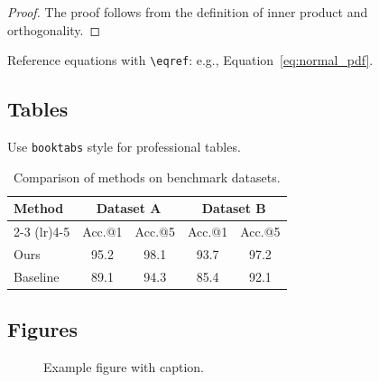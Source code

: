 \documentclass[]{fairmeta} %
\theoremstyle{plain}
\theoremstyle{definition}
\theoremstyle{remark}
\begin{document}
\begin{proof}
The proof follows from the definition of inner product and orthogonality.
\end{proof}

Reference equations with \verb|\eqref|: e.g., Equation~\eqref{eq:normal_pdf}.


\subsection{Tables}
\label{sec:tables}

Use \texttt{booktabs} style for professional tables.

\begin{table}[htbp]
  \centering
  \caption{Comparison of methods on benchmark datasets.}
  \begin{tabular}{lcccc}
    \toprule
    \multirow{2}{*}{Method} & \multicolumn{2}{c}{Dataset A} & \multicolumn{2}{c}{Dataset B} \\
    \cmidrule(lr){2-3} \cmidrule(lr){4-5}
           & Acc.@1 & Acc.@5 & Acc.@1 & Acc.@5 \\
    \midrule
    Ours    & 95.2  & 98.1  & 93.7  & 97.2 \\
    Baseline & 89.1  & 94.3  & 85.4  & 92.1 \\
    \bottomrule
  \end{tabular}
  \label{tab:results}
\end{table}


\subsection{Figures}
\label{sec:figures}

\begin{figure}[htbp]
  \centering
  \caption{Example figure with caption.}
  \label{fig:example}
\end{figure}
\end{document}
